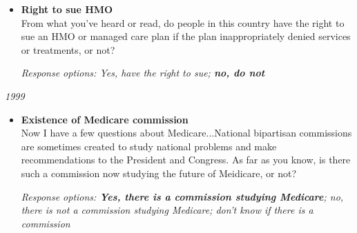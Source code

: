 \documentclass[12pt, letterpaper]{article}
\begin{document}
   \begin{itemize}
\item \textbf{Right to sue HMO} \\
From what you've heard or read, do people in this country have the right to sue an HMO or managed care plan if the plan inappropriately denied services or treatments, or not?

\textit{Response options: Yes, have the right to sue; \textbf{no, do not}} \\
\end{itemize}

 \large \noindent \textit{1999} 
\normalsize
   \begin{itemize}
\item \textbf{Existence of Medicare commission} \\
Now I have a few questions about Medicare...National bipartisan commissions are sometimes created to study national problems and make recommendations to the President and Congress. As far as you know, is there such a commission now studying the future of Meidicare, or not? 

\textit{Response options: \textbf{Yes, there is a commission studying Medicare}; no, there is not a commission studying Medicare; don't know if there is a commission} \\
\end{itemize}
\end{document}

